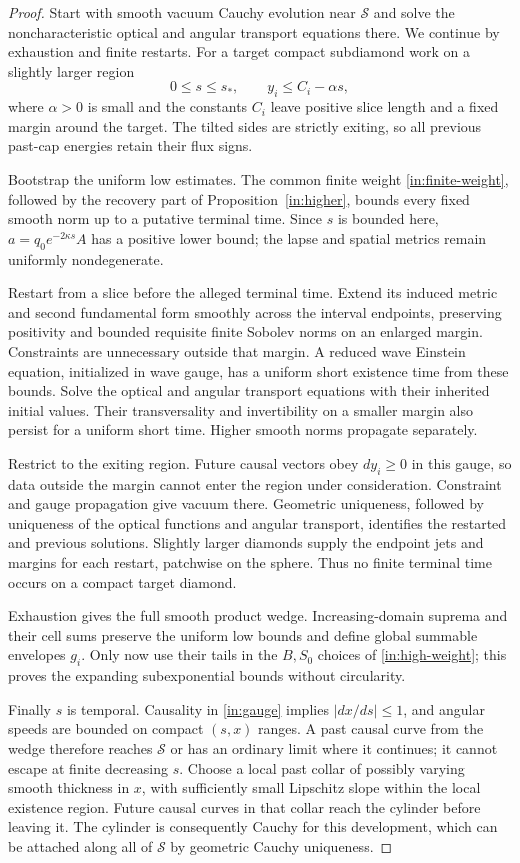 \begin{proof}
Start with smooth vacuum Cauchy evolution near $\mathcal S$ and solve
the noncharacteristic optical and angular transport equations there.
We continue by exhaustion and finite restarts.
For a target compact subdiamond work on a slightly larger region
\[
 0\le s\le s_*,\qquad y_i\le C_i-\alpha s,
\]
where $\alpha>0$ is small and the constants $C_i$ leave positive
slice length and a fixed margin around the target. The tilted sides
are strictly exiting, so all previous past-cap energies retain their
flux signs.

Bootstrap the uniform low estimates. The common finite weight
\eqref{in:finite-weight}, followed by the recovery part of
Proposition~\ref{in:higher}, bounds every fixed smooth norm up to
a putative terminal time. Since $s$ is bounded here,
$a=q_0e^{-2\kappa s}A$ has a positive lower bound; the lapse and
spatial metrics remain uniformly nondegenerate.

Restart from a slice before the alleged terminal time. Extend its
induced metric and second fundamental form smoothly across the interval
endpoints, preserving positivity and bounded requisite finite Sobolev
norms on an enlarged margin. Constraints are unnecessary outside that
margin. A reduced wave Einstein equation, initialized in wave gauge,
has a uniform short existence time from these bounds. Solve the optical
and angular transport equations with their inherited initial values.
Their transversality and invertibility on a smaller margin also persist
for a uniform short time. Higher smooth norms propagate separately.

Restrict to the exiting region. Future causal vectors obey
$dy_i\ge0$ in this gauge, so data outside the margin cannot enter
the region under consideration. Constraint and gauge propagation give
vacuum there. Geometric uniqueness, followed by uniqueness of the
optical functions and angular transport, identifies the restarted and
previous solutions. Slightly larger diamonds supply the endpoint jets
and margins for each restart, patchwise on the sphere. Thus no finite
terminal time occurs on a compact target diamond.

Exhaustion gives the full smooth product wedge. Increasing-domain
suprema and their cell sums preserve the uniform low bounds and define
global summable envelopes $g_i$. Only now use their tails in the
$B,S_0$ choices of \eqref{in:high-weight}; this proves the expanding
subexponential bounds without circularity.

Finally $s$ is temporal. Causality in \eqref{in:gauge} implies
$|dx/ds|\le1$, and angular speeds are bounded on compact $(s,x)$
ranges. A past causal curve from the wedge therefore reaches
$\mathcal S$ or has an ordinary limit where it continues; it cannot
escape at finite decreasing $s$. Choose a local past collar of
possibly varying smooth thickness in $x$, with sufficiently small
Lipschitz slope within the local existence region. Future causal
curves in that collar reach the cylinder before leaving it. The
cylinder is consequently Cauchy for this development, which can be
attached along all of $\mathcal S$ by geometric Cauchy uniqueness.
\end{proof}

